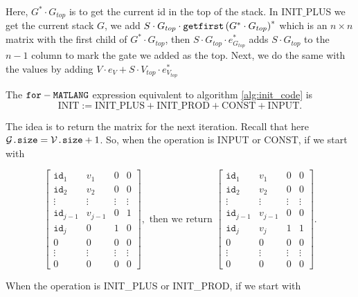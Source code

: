 Here, $G^*\cdot G_{top}$ is to get the current id in the top of the stack. In INIT${\_}$PLUS we get the current stack $G$, we add $S\cdot G_{top} \cdot \texttt{getfirst}\left(G^*\cdot G_{top} \right)^*$ which is an $n\times n$ matrix with the first child of $G^*\cdot G_{top}$, then $S\cdot G_{top}\cdot e_{G_{top}}^*$ adds $S\cdot G_{top}$ to the $n-1$ column to mark the gate we added as the top. Next, we do the same with the values by adding $V\cdot e_{V} + S\cdot V_{top}\cdot e_{V_{top}}^*$

The $\texttt{for}-\texttt{MATLANG}$ expression equivalent to algorithm \ref{alg:init_code} is $$\text{INIT}:=\text{INIT{\_}PLUS}+\text{INIT{\_}PROD}+\text{CONST}+\text{INPUT}.$$

The idea is to return the matrix for the next iteration. Recall that here $\mathcal{G}\texttt{.size}=\mathcal{V}\texttt{.size} + 1$. So, when the operation is INPUT or CONST, if we start with

\[
\begin{bmatrix}
    \texttt{id}_1 & v_1 & 0 & 0 \\
    \texttt{id}_2 & v_2 & 0 & 0 \\
    \vdots & \vdots & \vdots & \vdots \\
    \texttt{id}_{j-1} & v_{j-1} & 0 & 1 \\
    \texttt{id}_j & 0 & 1 & 0 \\
    0 & 0 & 0 & 0 \\
    \vdots & \vdots & \vdots & \vdots \\
     0 & 0 & 0 & 0
\end{bmatrix}, \text{ then we return }
\begin{bmatrix}
    \texttt{id}_1 & v_1 & 0 & 0 \\
    \texttt{id}_2 & v_2 & 0 & 0 \\
    \vdots & \vdots & \vdots & \vdots \\
    \texttt{id}_{j-1} & v_{j-1} & 0 & 0 \\
    \texttt{id}_j & v_j & 1 & 1 \\
    0 & 0 & 0 & 0 \\
    \vdots & \vdots & \vdots & \vdots \\
     0 & 0 & 0 & 0
\end{bmatrix}.
\]

When the operation is INIT{\_}PLUS or INIT{\_}PROD, if we start with 

